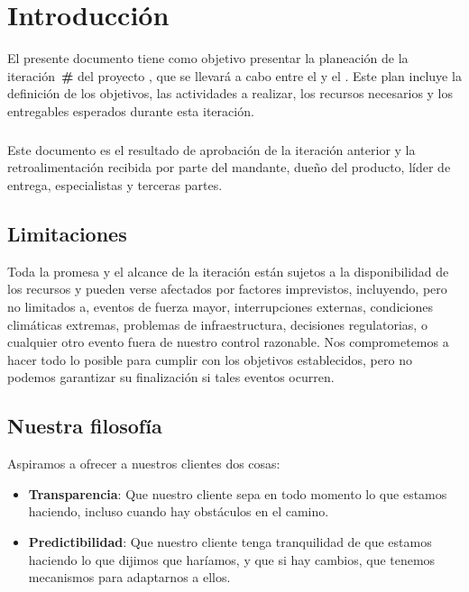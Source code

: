 \chapter{Introducción}

El presente documento tiene como objetivo presentar la planeación de la 
iteración~\textbf{\#\axSprintId} del proyecto \textbf{\axProjectName}, que se llevará a cabo 
entre el \textbf{\axSprintStart} y el \textbf{\axSprintEnd}. Este plan incluye la definición de 
los objetivos, las actividades a realizar, los recursos necesarios y los 
entregables esperados durante esta iteración.

\paragraph{}
Este documento es el resultado de aprobación de la iteración anterior y la 
retroalimentación recibida por parte del mandante, dueño del producto, líder de 
entrega, especialistas y terceras partes.

\section{Limitaciones}
Toda la promesa y el alcance de la iteración están sujetos a la disponibilidad de los
recursos y pueden verse afectados por factores imprevistos, incluyendo, pero no 
limitados a, eventos de fuerza mayor, interrupciones externas, condiciones 
climáticas extremas, problemas de infraestructura, decisiones regulatorias, o 
cualquier otro evento fuera de nuestro control razonable. Nos comprometemos a 
hacer todo lo posible para cumplir con los objetivos establecidos, pero no 
podemos garantizar su finalización si tales eventos ocurren.

\section{Nuestra filosofía}
Aspiramos a ofrecer a nuestros clientes dos cosas:

\begin{itemize}
  \item \textbf{Transparencia}: Que nuestro cliente sepa en todo momento lo que
  estamos haciendo, incluso cuando hay obstáculos en el camino.
  \item \textbf{Predictibilidad}: Que nuestro cliente tenga tranquilidad de que 
  estamos haciendo lo que dijimos que haríamos, y que si hay cambios, que tenemos 
  mecanismos para adaptarnos a ellos.
\end{itemize}

